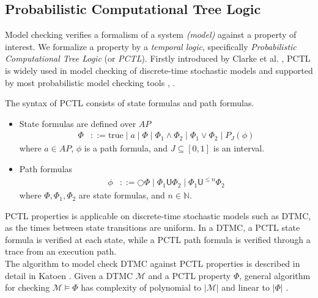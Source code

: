 \subsection{Probabilistic Computational Tree Logic}
Model checking verifies a formalism of a system \textit{(model)} against a property of interest. We
formalize a property by a \textit{temporal logic}, specifically \textit{Probabilistic Computational
      Tree Logic} (or \textit{PCTL}). Firstly introduced by Clarke et al. \cite{clarke1986automatic}, PCTL
is widely used in model checking of discrete-time stochastic models and supported by most
probabilistic model checking tools \cite{dehnert2017storm}, \cite{kwiatkowska2011prism}.
\begin{definition}[PCTL] The syntax of PCTL consists of state formulas and path formulas.
      \begin{itemize}
            \item State formulas are defined over $AP$
                  \begin{align*}
                        \Phi & ::= \text{true} \;|\; a \;|\; \Phi \;|\; \Phi_1 \wedge \Phi_2 \;|\; \Phi_1 \vee \Phi_2 \;|\;  P_{J}(\phi)
                  \end{align*}
                  where $a\in AP$, $\phi$ is a path formula, and $J\subseteq[0,1]$ is an interval.
            \item Path formulas
                  \begin{align*}
                        \phi & ::= \bigcirc \Phi \;|\; \Phi_1 \mathsf{U} \Phi_2 \;|\; \Phi_1 \mathsf{U}^{\leq n} \Phi_2
                  \end{align*}
                  where $\Phi,\Phi_1,\Phi_2$ are state formulas, and $n\in \mathbb{N}$.
      \end{itemize}
\end{definition}
PCTL properties is applicable on discrete-time stochastic models such as DTMC, as the times between
state transitions are uniform. In a DTMC, a PCTL state formula is verified at each state, while a
PCTL path formula is verified through a trace from an execution path.\\
The algorithm to model check DTMC against PCTL properties is described in detail in Katoen
\cite{baier2008principles}. Given a DTMC $\mathcal{M}$ and a PCTL property $\Phi$, general algorithm
for checking $\mathcal{M}\models\Phi$ has complexity of polynomial to $|\mathcal{M}|$ and linear to
$|\Phi|$ \cite{katoen2013model}.
